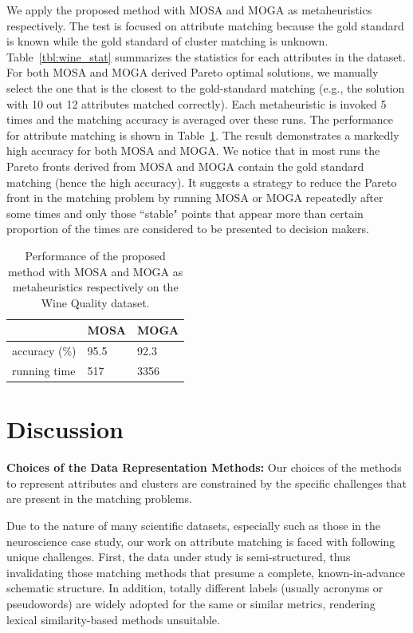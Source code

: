 We apply the proposed method with MOSA and MOGA as metaheuristics respectively. The test is focused on attribute matching because the gold standard is known while the gold standard of cluster matching is unknown. Table~\ref{tbl:wine_stat} summarizes the statistics for each attributes in the dataset. For both MOSA and MOGA derived Pareto optimal solutions, we manually select the one that is the closest to the gold-standard matching (e.g., the solution with 10 out 12 attributes matched correctly). Each metaheuristic is invoked 5 times and the matching accuracy is averaged over these runs. The performance for attribute matching is shown in Table~\ref{tbl:wine_res}. The result demonstrates a markedly high accuracy for both MOSA and MOGA. We notice that in most runs the Pareto fronts derived from MOSA and MOGA contain the gold standard matching (hence the high accuracy). It suggests a strategy to reduce the Pareto front in the matching problem by running MOSA or MOGA repeatedly after some times and only those ``stable" points that appear more than certain proportion of the times are considered to be presented to decision makers.

\begin{table}[tbh]
\begin{center}
\begin{tabular}{l|l|l}
\hline
                &   MOSA    &   MOGA    \\
\hline
accuracy (\%)   &    95.5   &   92.3    \\
running time    &    517    &   3356    \\
\hline
\end{tabular}
\end{center}
\caption[The performance of MOSA and MOGA on the Wine Quality dataset]{\label{tbl:wine_res} Performance of the proposed method with MOSA and MOGA as metaheuristics respectively on the Wine Quality dataset.}
\end{table}


\section{Discussion}
\textbf{Choices of the Data Representation Methods:}
Our choices of the methods to represent attributes and clusters are constrained by the specific challenges that are present in the matching problems.

Due to the nature of many scientific datasets, especially such as those in the neuroscience case study, our work on attribute matching is faced with following unique challenges. First, the data under study is semi-structured, thus invalidating those matching methods that presume a complete, known-in-advance schematic structure. In addition, totally different labels (usually acronyms or pseudowords) are widely adopted for the same or similar metrics, rendering lexical similarity-based methods unsuitable.


